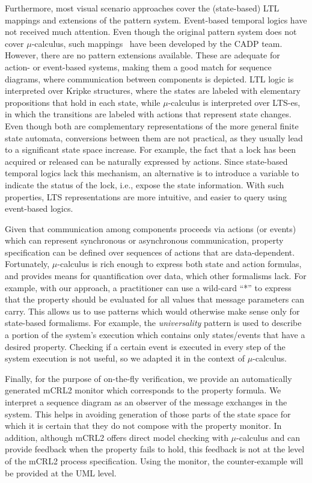 \documentclass[letter]{llncs}
\begin{document}
Furthermore, most visual scenario approaches cover the (state-based) LTL mappings and extensions of the pattern system. 
Event-based temporal logics have not received much attention. Even though the original pattern 
system does not cover $\mu$-calculus, such mappings~\cite{RAFMC} have been developed by the CADP team.
However, there are no pattern extensions available. These are adequate for action- or event-based systems,
making them a good match for sequence diagrams, where communication between components is depicted.
LTL logic is interpreted over Kripke structures, where the states are labeled with elementary 
propositions that hold in each state, while $\mu$-calculus is interpreted over LTS-es, in which the transitions
are labeled with actions that represent state changes.
Even though both are complementary representations of the more general finite state automata, 
conversions between them are not practical, as they usually lead to a significant state space increase. 
For example, the fact that a lock has
been acquired or released can be naturally expressed by actions. Since state-based
temporal logics lack this mechanism, an alternative is to introduce a variable to indicate
the status of the lock, i.e., expose the state information. With such properties, LTS
representations are more intuitive, and easier to query using event-based logics.
\vspace{-2 pt}

Given that communication among components proceeds via actions (or events) which can
represent synchronous or asynchronous communication, property specification
can be defined over sequences of actions that are data-dependent.
Fortunately, $\mu$-calculus is rich enough to express both state and action formulas,
and provides means for quantification over data, which other formalisms lack. 
For example, with our approach, a practitioner can use 
a wild-card ``*'' to express that the property should be evaluated for all values
that message parameters can carry. This allows us to use patterns which would otherwise
make sense only for state-based formalisms. For example, the \emph{universality}
pattern is used to describe a portion of the system's execution which contains only states/events that have a desired property.
Checking if a certain event is executed in every step of the system execution is not useful,
so we adapted it in the context of $\mu$-calculus. 
\vspace{-1 pt}

Finally, for the purpose of on-the-fly verification, we provide an
automatically generated mCRL2 monitor which corresponds to the property formula.
We interpret a sequence diagram as an observer of
the message exchanges in the system. This helps in avoiding generation of those
parts of the state space for which it is certain that they do not compose with the
property monitor. In addition, although mCRL2 offers direct model checking
with $\mu$-calculus and can provide feedback when the property fails to hold, this
feedback is not at the level of the mCRL2 process specification.
Using the monitor, the counter-example will be provided at the UML level.
\end{document}
